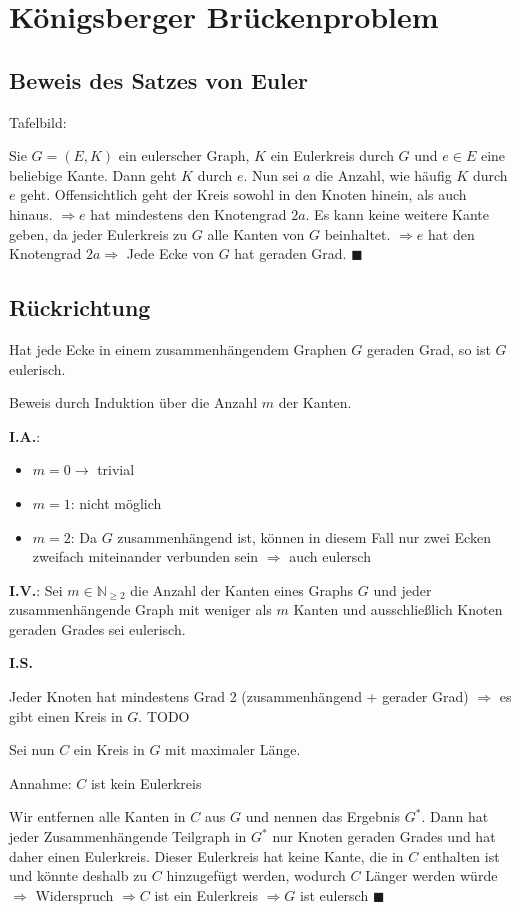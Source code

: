 \documentclass[a4paper,9pt]{scrartcl}
\begin{document}
\section{Königsberger Brückenproblem}
\subsection{Beweis des Satzes von Euler}
Tafelbild:

Sie $G = (E, K)$ ein eulerscher Graph, $K$ ein Eulerkreis durch $G$ und 
$e \in E$ eine beliebige Kante.
Dann geht $K$ durch $e$. Nun sei $a$ die Anzahl, wie häufig $K$ durch $e$ geht.
Offensichtlich geht der Kreis sowohl in den Knoten hinein, als auch hinaus.
$\Rightarrow e$ hat mindestens den Knotengrad $2a$. Es kann keine weitere
Kante geben, da jeder Eulerkreis zu $G$ alle Kanten von $G$ beinhaltet.
$\Rightarrow e$ hat den Knotengrad $2a \Rightarrow$ Jede Ecke von $G$ hat geraden
Grad. $\blacksquare$

\subsection{Rückrichtung}
Hat jede Ecke in einem zusammenhängendem Graphen $G$ geraden Grad, so ist $G$ eulerisch.

Beweis durch Induktion über die Anzahl $m$ der Kanten.

\textbf{I.A.}:
\begin{itemize}
    \item $m=0 \rightarrow$ trivial
    \item $m = 1$: nicht möglich
    \item $m = 2$: Da $G$ zusammenhängend ist, können in diesem Fall nur zwei
Ecken zweifach miteinander verbunden sein $\Rightarrow$ auch eulersch
\end{itemize}

\textbf{I.V.}: Sei $m \in \mathbb{N}_{\geq 2}$ die Anzahl der Kanten eines 
Graphs $G$ und jeder zusammenhängende Graph mit weniger als $m$ Kanten und 
ausschließlich Knoten geraden Grades sei eulerisch.

\textbf{I.S.} 

Jeder Knoten hat mindestens Grad 2 (zusammenhängend + gerader Grad)
$\Rightarrow$ es gibt einen Kreis in $G$. TODO

Sei nun $C$ ein Kreis in $G$ mit maximaler Länge.

Annahme: $C$ ist kein Eulerkreis

Wir entfernen alle Kanten in $C$ aus $G$ und nennen das Ergebnis $G^*$.
Dann hat jeder Zusammenhängende Teilgraph in $G^*$ nur Knoten geraden Grades
und hat daher einen Eulerkreis. Dieser Eulerkreis hat keine Kante, die in $C$
enthalten ist und könnte deshalb zu $C$ hinzugefügt werden, wodurch $C$ Länger
werden würde $\Rightarrow$ Widerspruch $\Rightarrow C$ ist ein Eulerkreis
$\Rightarrow G$ ist eulersch  $\blacksquare$
 
\end{document}
